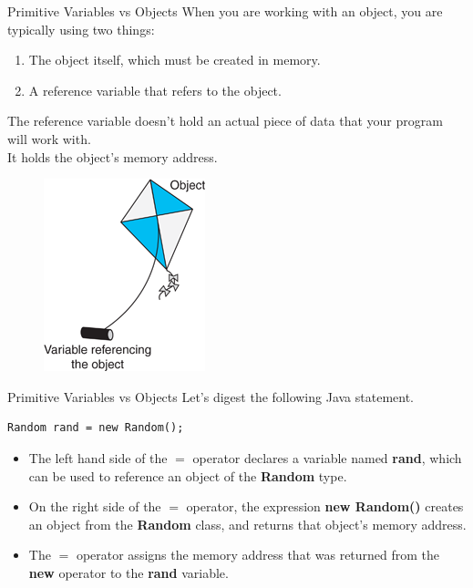 \documentclass[11pt]{beamer}
\begin{document}
\begin{frame}{Primitive Variables vs Objects}
    When you are working with an object, you are typically using two things:
    \begin{enumerate}
        \item The object itself, which must be created in memory.
        \item A reference variable that refers to the object.
    \end{enumerate}

    The reference variable doesn't hold an actual piece of data that your program will work with. \\ \vspace{1em}
    It holds the object’s memory address.
    \noindent 
    \begin{figure}[H]
    \centering
    \includegraphics[scale=0.6]{Images/chapter06_ReferenceVariableAndObject.png}
    \end{figure}
\end{frame}

\begin{frame}[fragile]{Primitive Variables vs Objects}
    Let's digest the following Java statement.
    \begin{lstlisting}
Random rand = new Random();
    \end{lstlisting}
    \begin{itemize}
        \item The left hand side of the $=$ operator declares a variable named \textbf{rand}, which can be used to reference an object of the \textbf{Random} type.
        \item On the right side of the $=$ operator, the expression \textbf{new Random()} creates an object from the \textbf{Random} class, and returns that object’s memory address.
        \item  The $=$ operator assigns the memory address that was returned from the \textbf{new} operator to the \textbf{rand} variable.
    \end{itemize}
\end{frame}
\end{document}
